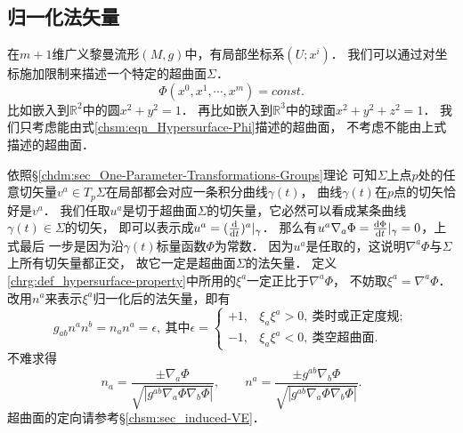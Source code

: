 
\subsection{归一化法矢量}\label{chsm:sec_Phi-n}
在$m+1$维广义黎曼流形$(M,g)$中，有局部坐标系$(U;x^i)$．
我们可以通过对坐标施加限制来描述一个特定的超曲面$\Sigma$．
\begin{equation}\label{chsm:eqn_Hypersurface-Phi}
    \Phi(x^0,x^1,\cdots,x^{m}) =const .
\end{equation}
比如嵌入到$\mathbb{R}^2$中的圆$x^2+y^2=1$．
再比如嵌入到$\mathbb{R}^3$中的球面$x^2+y^2+z^2=1$．
我们只考虑能由式\eqref{chsm:eqn_Hypersurface-Phi}描述的超曲面，
不考虑不能由上式描述的超曲面．

依照\S \ref{chdm:sec_One-Parameter-Transformations-Groups}理论
可知$\Sigma$上点$p$处的任意切矢量$v^a\in T_p \Sigma$在局部都会对应一条积分曲线$\gamma(t)$，
曲线$\gamma(t)$在$p$点的切矢恰好是$v^a$．
我们任取$u^a$是切于超曲面$\Sigma$的切矢量，它必然可以看成某条曲线$\gamma(t)\in \Sigma$的切矢，
即可以表示成$u^a=(\frac{{\rm d}}{{\rm d}t})^a|_{\gamma}$．
那么有$u^a\nabla_a \Phi= \frac{{\rm d}\Phi}{{\rm d}t}|_{\gamma} =0$，上式最后
一步是因为沿$\gamma(t)$标量函数$\Phi$为常数．
因为$u^a$是任取的，这说明$\nabla^a \Phi$与$\Sigma$上所有切矢量都正交，
故它一定是超曲面$\Sigma$的法矢量．
定义\ref{chrg:def_hypersurface-property}中所用的$\xi^a$一定正比于$\nabla^a \Phi$，
不妨取$\xi^a=\nabla^a\Phi$．
改用${n}^a$来表示$\xi^a$归一化后的法矢量，即有
\begin{equation}\label{chsm:eqn_unit-normal}
    g_{ab} {n}^a {n}^b=n_a n^a = \epsilon , \ \text{其中} \epsilon=
    \begin{cases}
        +1, & {\xi}_a {\xi}^a>0, \ \text{类时或正定度规}; \\
        -1, & {\xi}_a {\xi}^a<0, \ \text{类空超曲面}.
    \end{cases}
\end{equation}
不难求得
\begin{equation}\label{chsm:eqn_unit-normal-Phi}
    n_a=\frac{\pm \nabla_a \Phi}{\sqrt{|g^{ab}\nabla_a \Phi\nabla_b \Phi|} },     \qquad
    n^a=\frac{\pm g^{ab}\nabla_b \Phi}{\sqrt{|g^{ab}\nabla_a \Phi\nabla_b \Phi|} } .
\end{equation}
超曲面的定向请参考\S\ref{chsm:sec_induced-VE}．



